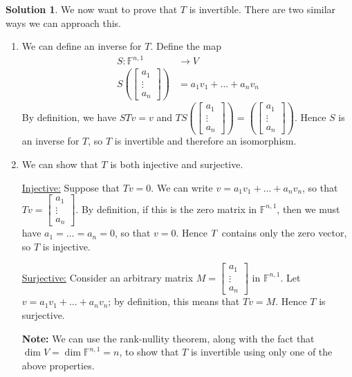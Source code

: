 \documentclass[12pt]{article}
\theoremstyle{definition}
\theoremstyle{definition}
\newtheorem*{soln}{Solution}
\newcommand{\F}{\mathbb{F}}
\begin{document}
\begin{soln}
We now want to prove that $T$ is invertible. There are two similar ways we can approach this.
\begin{enumerate}[label=\textbf{Method \arabic*.}]
\item We can define an inverse for $T$. Define the map 
\begin{align*}
S:\F^{n,1} &\to V\\
S\left(\begin{bmatrix} a_1 \\ \vdots \\ a_n \end{bmatrix}\right) &= a_1v_1+\dots+a_nv_n
\end{align*}
By definition, we have $STv=v$ and $TS\left(\begin{bmatrix} a_1 \\ \vdots \\ a_n \end{bmatrix}\right)=\left(\begin{bmatrix} a_1 \\ \vdots \\ a_n \end{bmatrix}\right)$. Hence $S$ is an inverse for $T$, so $T$ is invertible and therefore an isomorphism.

\item We can show that $T$ is both injective and surjective.

\underline{Injective:} Suppose that $Tv=0$. We can write $v=a_1v_1+\dots+a_nv_n$, so that $Tv=\begin{bmatrix} a_1 \\ \vdots \\ a_n \end{bmatrix}$. By definition, if this is the zero matrix in $\F^{n,1}$, then we must have $a_1=\dots=a_n=0$, so that $v=0$. Hence $\null T$ contains only the zero vector, so $T$ is injective.

\underline{Surjective:} Consider an arbitrary matrix $M=\begin{bmatrix} a_1 \\ \vdots \\ a_n \end{bmatrix}$ in $\F^{n,1}$. Let $v=a_1v_1+\dots+a_nv_n$; by definition, this means that $Tv=M$. Hence $T$ is surjective.

\textbf{Note:} We can use the rank-nullity theorem, along with the fact that $\dim V=\dim\F^{n,1}=n$, to show that $T$ is invertible using only one of the above properties.
\end{enumerate}
\end{soln}
\end{document}
